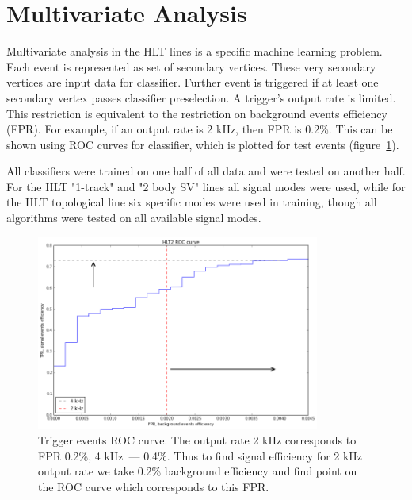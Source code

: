 \documentclass[a4paper]{jpconf}
\begin{document}
\section{Multivariate Analysis}
Multivariate analysis in the HLT lines is a specific machine learning problem. Each event is represented as set of secondary vertices. These very secondary vertices are input data for classifier. Further event is triggered if at least one secondary vertex passes classifier preselection. A trigger's output rate is limited. This restriction is equivalent to the restriction on background events efficiency (FPR). For example, if an output rate is 2 kHz, then FPR is 0.2\%. This can be shown using ROC curves for classifier, which is plotted for test events (figure~\ref{roc}).

All classifiers were trained on one half of all data and were tested on another half. For the HLT "1-track" and "2 body SV" lines all signal modes were used, while for the HLT topological line six specific modes were used in training, though all algorithms were tested on all available signal modes.

\begin{figure}[h]
\includegraphics[width=22pc]{../images/roc_events.png}\hspace{2pc}%
\begin{minipage}[b]{14pc}\caption{\label{roc} Trigger events ROC curve. The output rate 2 kHz corresponds to FPR 0.2\%, 4 kHz~--- 0.4\%. Thus to find signal efficiency for 2 kHz output rate we take 0.2\% background efficiency and find point on the ROC curve which corresponds to this FPR.}
\end{minipage}
\end{figure}
\end{document}
